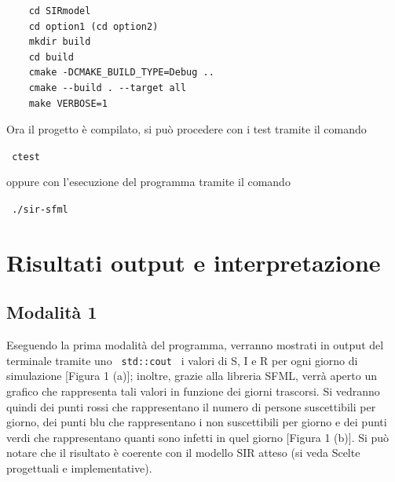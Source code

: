 \documentclass[a4paper,10 pt]{article}
\begin{document}
\begin{lstlisting}
	cd SIRmodel
	cd option1 (cd option2)
	mkdir build
	cd build
	cmake -DCMAKE_BUILD_TYPE=Debug ..
	cmake --build . --target all
	make VERBOSE=1 
\end{lstlisting}

Ora il progetto è compilato, si può procedere con i test tramite il comando
\begin {quoting}
 \verb! ctest !
\end{quoting}
oppure con l'esecuzione del programma tramite il comando
\begin {quoting}
 \verb! ./sir-sfml !
\end{quoting}
\section{Risultati output e interpretazione}
\subsection{Modalità 1}
Eseguendo la prima modalità del programma, verranno mostrati in output del terminale tramite uno  \verb! std::cout ! i valori di S, I e R per ogni giorno di simulazione [Figura 1 (a)]; inoltre, grazie alla libreria SFML, verrà aperto un grafico che rappresenta tali valori in funzione dei giorni trascorsi. Si vedranno quindi dei punti rossi che rappresentano il numero di persone suscettibili per giorno, dei punti blu che rappresentano i non suscettibili per giorno e dei punti verdi che rappresentano quanti sono infetti in quel giorno [Figura 1 (b)]. Si può notare che il risultato è coerente con il modello SIR atteso (si veda Scelte progettuali e implementative).
\end{document}
